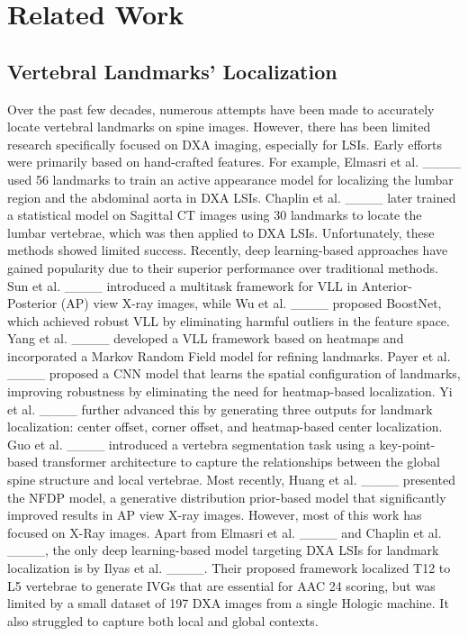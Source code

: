 \section{Related Work}
\subsection{Vertebral Landmarks' Localization}
Over the past few decades, numerous attempts have been made to accurately locate vertebral landmarks on spine images. However, there has been limited research specifically focused on DXA imaging, especially for LSIs. Early efforts were primarily based on hand-crafted features. For example, Elmasri et al. ____ used 56 landmarks to train an active appearance model for localizing the lumbar region and the abdominal aorta in DXA LSIs. Chaplin et al. ____ later trained a statistical model on Sagittal CT images using 30 landmarks to locate the lumbar vertebrae, which was then applied to DXA LSIs. Unfortunately, these methods showed limited success. Recently, deep learning-based approaches have gained popularity due to their superior performance over traditional methods. Sun et al. ____ introduced a multitask framework for VLL in Anterior-Posterior (AP) view X-ray images, while Wu et al. ____ proposed BoostNet, which achieved robust VLL by eliminating harmful outliers in the feature space. Yang et al. ____ developed a VLL framework based on heatmaps and incorporated a Markov Random Field model for refining landmarks. Payer et al. ____ proposed a CNN model that learns the spatial configuration of landmarks, improving robustness by eliminating the need for heatmap-based localization. Yi et al. ____ further advanced this by generating three outputs for landmark localization: center offset, corner offset, and heatmap-based center localization. Guo et al. ____ introduced a vertebra segmentation task using a key-point-based transformer architecture to capture the relationships between the global spine structure and local vertebrae. Most recently, Huang et al. ____ presented the NFDP model, a generative distribution prior-based model that significantly improved results in AP view X-ray images. However, most of this work has focused on X-Ray images. Apart from Elmasri et al. ____ and Chaplin et al. ____, the only deep learning-based model targeting DXA LSIs for landmark localization is by Ilyas et al. ____. Their proposed framework localized T12 to L5 vertebrae to generate IVGs that are essential for AAC 24 scoring, but was limited by a small dataset of 197 DXA images from a single Hologic machine. It also struggled to capture both local and global contexts. \par

